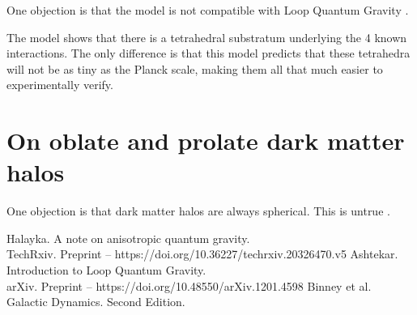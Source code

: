 \documentclass[12pt]{article}
\begin{document}
One objection is that the model is not compatible with Loop Quantum Gravity \cite{ashtekar}.

The model shows that there is a tetrahedral substratum underlying the 4 known interactions.
The only difference is that this model predicts that these tetrahedra will not be as tiny as the Planck scale, making them all that much easier to experimentally verify.




\section{On oblate and prolate dark matter halos}

One objection is that dark matter halos are always spherical.
This is untrue \cite{binney}.





\begin{thebibliography}{9}

 Halayka. A note on anisotropic quantum gravity.\\TechRxiv. Preprint -- https://doi.org/10.36227/techrxiv.20326470.v5
 Ashtekar. Introduction to Loop Quantum Gravity.\\arXiv. Preprint -- https://doi.org/10.48550/arXiv.1201.4598
 Binney et al. Galactic Dynamics. Second Edition.
\end{thebibliography}
\end{document}
